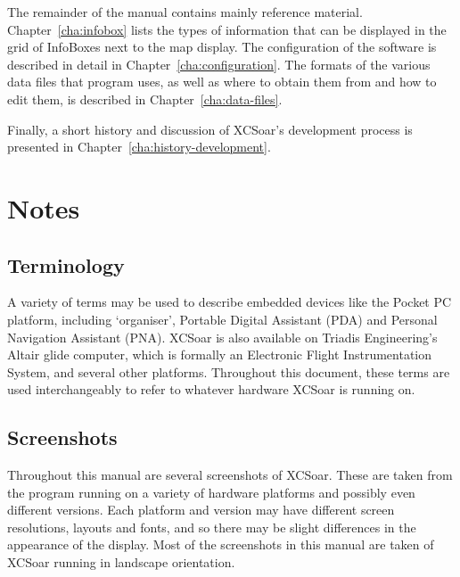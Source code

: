 The remainder of the manual contains mainly reference material.
Chapter~\ref{cha:infobox} lists the types of information that can be
displayed in the grid of InfoBoxes next to the map display.  The
configuration of the software is described in detail in
Chapter~\ref{cha:configuration}.  The formats of the various data
files that program uses, as well as where to obtain them from and how
to edit them, is described in Chapter~\ref{cha:data-files}.

Finally, a short history and discussion of XCSoar's development
process is presented in Chapter~\ref{cha:history-development}.

\section{Notes}

\subsection*{Terminology}
A variety of terms may be used to describe embedded devices like the Pocket PC
platform, including `organiser', Portable Digital Assistant (PDA)
and Personal Navigation Assistant (PNA).  XCSoar is
also available on Triadis Engineering's Altair glide computer, which is
formally an Electronic Flight Instrumentation System, and several other
platforms. Throughout this document, these terms are used interchangeably to
refer to whatever hardware XCSoar is running on.

\subsection*{Screenshots}
Throughout this manual are several screenshots of XCSoar. These are
taken from the program running on a variety of hardware platforms and possibly
even different versions. Each platform and version may have different screen
resolutions, layouts and fonts, and so there may be slight differences in the
appearance of the display. Most of the screenshots in this manual are taken of
XCSoar running in landscape orientation.

